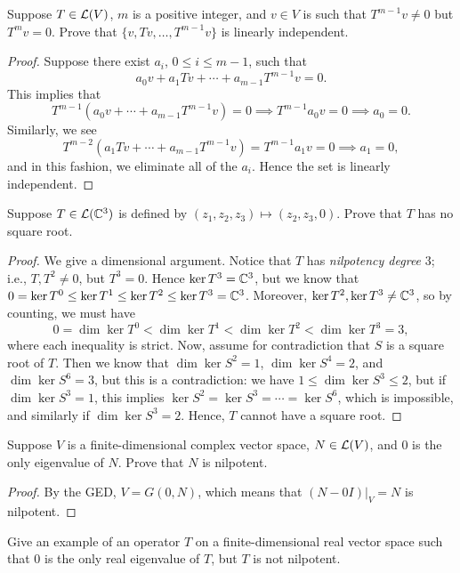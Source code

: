 \documentclass{article}
\begin{document}
\begin{example}[8A.5]
Suppose $T\in\mathcal L(V)$, $m$ is a positive integer, and $v\in V$ is such that $T^{m-1}v\neq 0$ but $T^mv= 0$. Prove that $\{v, Tv, \ldots, T^{m-1}v\}$ is linearly independent.
\end{example}
\begin{proof}
Suppose there exist $a_i$, $0\leq i\leq m-1$, such that
$$a_0v + a_1Tv + \cdots + a_{m-1}T^{m-1}v = 0.$$
This implies that
$$T^{m-1}(a_0v + \cdots + a_{m-1}T^{m-1}v) = 0 \implies T^{m-1}a_0v = 0 \implies a_0 = 0.$$
Similarly, we see
$$T^{m-2}(a_1Tv + \cdots + a_{m-1}T^{m-1}v) = T^{m-1}a_1v = 0 \implies a_1=0,$$
and in this fashion, we eliminate all of the $a_i$. Hence the set is linearly independent.
\end{proof}
\begin{example}[8A.6]
Suppose $T\in\mathcal L(\mathbb C^3)$ is defined by $(z_1,z_2,z_3) \mapsto (z_2, z_3, 0)$. Prove that $T$ has no square root.
\end{example}
\begin{proof}
We give a dimensional argument. Notice that $T$ has \textit{nilpotency degree} $3$; i.e., $T, T^2\neq 0$, but $T^3 = 0$. Hence $\ker T^3 = \mathbb C^3$, but we know that $0=\ker T^0 \leq\ker T^1\leq\ker T^2\leq \ker T^3 = \mathbb C^3$. Moreover, $\ker T^2, \ker T^3\neq \mathbb C^3$, so by counting, we must have
$$0 = \dim\ker T^0 < \dim \ker T^1 < \dim \ker T^2 < \dim\ker T^3 = 3,$$
where each inequality is strict. Now, assume for contradiction that $S$ is a square root of $T$. Then we know that $\dim\ker S^2 = 1$, $\dim\ker S^4 = 2$, and $\dim\ker S^6 = 3$, but this is a contradiction: 
we have $1\leq \dim\ker S^3\leq 2$, but if $\dim\ker S^3 = 1$, this implies $\ker S^2 = \ker S^3 = \cdots = \ker S^6$, which is impossible, and similarly if $\dim \ker S^3 = 2$. Hence, $T$ cannot have a square root.
\end{proof}
\newpage
\begin{example}[8B.1]
Suppose $V$ is a finite-dimensional complex vector space, $N\in\mathcal L(V)$, and $0$ is the only eigenvalue of $N$. Prove that $N$ is nilpotent.
\end{example}
\begin{proof}
By the GED, $V = G(0, N)$, which means that $(N-0I)|_V = N$ is nilpotent.
\end{proof}
\begin{example}[8B.2]
Give an example of an operator $T$ on a finite-dimensional real vector space such that $0$ is the only real eigenvalue of $T$, but $T$ is not nilpotent.
\end{example}
\end{document}
